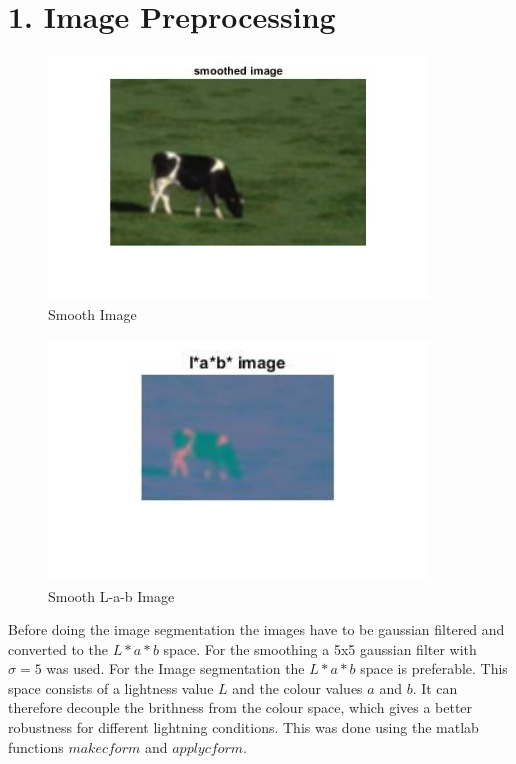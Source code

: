 \documentclass[12pt]{article}
\begin{document}
\maketitle


\section{1. Image Preprocessing}

\vspace{5mm}
\begin{figure}[ht]
	\centering
	\includegraphics[width=0.9\textwidth]{smooth.jpg}
	\caption{Smooth Image}
	\label{fig1}
\end{figure}
\vspace{5mm}
\begin{figure}[ht]
	\centering
	\includegraphics[width=0.9\textwidth]{lab.jpg}
	\caption{Smooth L-a-b Image}
	\label{fig1}
\end{figure}
\vspace{5mm}


Before doing the image segmentation the images have to be gaussian filtered and converted to the $L*a*b$ space. For the smoothing a 5x5 gaussian filter with $\sigma = 5$ was used. For the Image segmentation the $L*a*b$ space is preferable. This space consists of a lightness value $L$ and the colour values $a$ and $b$. It can therefore decouple the brithness from the colour space, which gives a better robustness for different lightning conditions. This was done using the matlab functions $makecform$ and $applycform$.  
\end{document}

